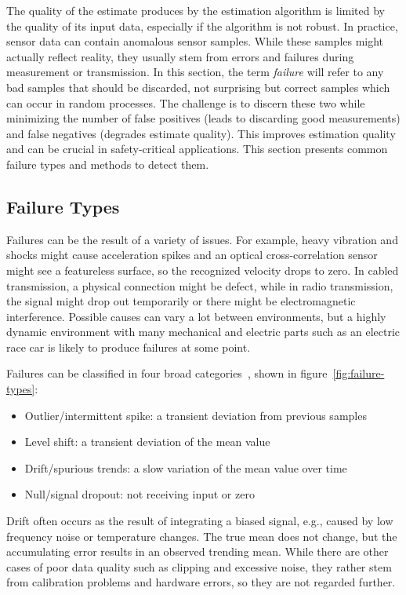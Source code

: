 The quality of the estimate produces by the estimation algorithm is limited by the quality of its input data, especially if the algorithm is not robust. In practice, sensor data can contain anomalous sensor samples. While these samples might actually reflect reality, they usually stem from errors and failures during measurement or transmission. In this section, the term \textit{failure} will refer to any bad samples that should be discarded, not surprising but correct samples which can occur in random processes. The challenge is to discern these two while minimizing the number of false positives (leads to discarding good measurements) and false negatives (degrades estimate quality). This improves estimation quality and can be crucial in safety-critical applications. This section presents common failure types and methods to detect them.


\subsection{Failure Types}\label{sec:failure-types}
Failures can be the result of a variety of issues. For example, heavy vibration and shocks might cause acceleration spikes and an optical cross-correlation sensor might see a featureless surface, so the recognized velocity drops to zero. In cabled transmission, a physical connection might be defect, while in radio transmission, the signal might drop out temporarily or there might be electromagnetic interference. Possible causes can vary a lot between environments, but a highly dynamic environment with many mechanical and electric parts such as an electric race car is likely to produce failures at some point.

Failures can be classified in four broad categories~\cites[p.~19]{Kabzan.2019}[p.~165~ff.]{Himmelblau.1994}, shown in figure~\ref{fig:failure-types}:
\begin{itemize}
\item Outlier/intermittent spike: a transient deviation from previous samples
\item Level shift: a transient deviation of the mean value
\item Drift/spurious trends: a slow variation of the mean value over time
\item Null/signal dropout: not receiving input or zero
\end{itemize}
Drift often occurs as the result of integrating a biased signal, e.g., caused by low frequency noise or temperature changes. The true mean does not change, but the accumulating error results in an observed trending mean. While there are other cases of poor data quality such as clipping and excessive noise, they rather stem from calibration problems and hardware errors, so they are not regarded further.

